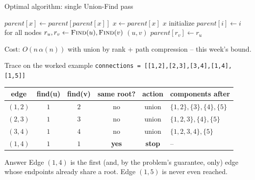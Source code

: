 \documentclass[11pt,aspectratio=169]{beamer}
\begin{document}
\begin{frame}{Optimal algorithm: single Union-Find pass}
  \footnotesize
  \begin{algorithmic}[1]
        \State $parent[x] \gets parent[parent[x]]$ 
        \State $x \gets parent[x]$
      \EndWhile
      \State \Return $x$
    \EndFunction
      \State initialize $parent[i] \gets i$ for all nodes
       
        \State $r_u, r_v \gets \Call{Find}{u}, \Call{Find}{v}$
          \State \Return $(u,v)$ 
        \EndIf
        \State $parent[r_v] \gets r_u$ 
      \EndFor
    \EndFunction
  \end{algorithmic}
  Cost: $O(n\,\alpha(n))$ with union by rank + path compression -- this week's bound.
\end{frame}

\begin{frame}{Trace on the worked example}
  \small
  \texttt{connections = [[1,2],[2,3],[3,4],[1,4],[1,5]]}
  \begin{center}
  \begin{tabular}{@{}cccccl@{}}
    \toprule
    edge & find(u) & find(v) & same root? & action & components after \\
    \midrule
    $(1,2)$ & $1$ & $2$ & no  & union & $\{1,2\}, \{3\}, \{4\}, \{5\}$ \\
    $(2,3)$ & $1$ & $3$ & no  & union & $\{1,2,3\}, \{4\}, \{5\}$ \\
    $(3,4)$ & $1$ & $4$ & no  & union & $\{1,2,3,4\}, \{5\}$ \\
    $(1,4)$ & $1$ & $1$ & \textbf{yes} & \textbf{stop} & -- \\
    \bottomrule
  \end{tabular}
  \end{center}
  \begin{exampleblock}{Answer}
    Edge $(1,4)$ is the first (and, by the problem's guarantee, only) edge whose
    endpoints already share a root. Edge $(1,5)$ is never even reached.
  \end{exampleblock}
\end{frame}
\end{document}
